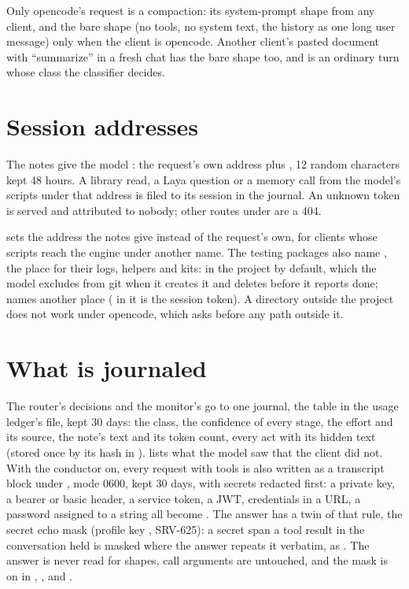Only opencode's request is a compaction: its system-prompt shape from any client, and the bare shape (no tools, no system text, the history as one long user message) only when the client is opencode. Another client's pasted document with ``summarize'' in a fresh chat has the bare shape too, and is an ordinary turn whose class the classifier decides.

\section{Session addresses}

The notes give the model : the request's own address plus , 12 random characters kept 48 hours. A library read, a Laya question or a memory call from the model's scripts under that address is filed to its session in the journal. An unknown token is served and attributed to nobody; other routes under  are a 404.

 sets the address the notes give instead of the request's own, for clients whose scripts reach the engine under another name. The testing packages also name , the place for their logs, helpers and kits:  in the project by default, which the model excludes from git when it creates it and deletes before it reports done;  names another place ( in it is the session token). A directory outside the project does not work under opencode, which asks before any path outside it.

\section{What is journaled}

The router's decisions and the monitor's go to one journal, the table  in the usage ledger's file, kept 30 days: the class, the confidence of every stage, the effort and its source, the note's text and its token count, every act with its hidden text (stored once by its hash in ).  lists what the model saw that the client did not. With the conductor on, every request with tools is also written as a transcript block under , mode 0600, kept 30 days, with secrets redacted first: a private key, a bearer or basic header, a service token, a JWT, credentials in a URL, a password assigned to a string all become . The answer has a twin of that rule, the secret echo mask (profile key , SRV-625): a secret span a tool result in the conversation held is masked where the answer repeats it verbatim,  as . The answer is never read for shapes, call arguments are untouched, and the mask is on in , ,  and .
